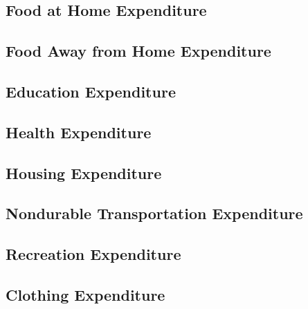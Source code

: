 \documentclass[a4paper,landscape]{article}
\begin{document}
\subsection{Food at Home Expenditure}

\clearpage

\subsection{Food Away from Home Expenditure}

\clearpage

\subsection{Education Expenditure}

\clearpage

\subsection{Health Expenditure}

\clearpage

\subsection{Housing Expenditure}

\clearpage

\subsection{Nondurable Transportation Expenditure}

\clearpage

\subsection{Recreation Expenditure}

\clearpage

\subsection{Clothing Expenditure}

\clearpage
\end{document}
